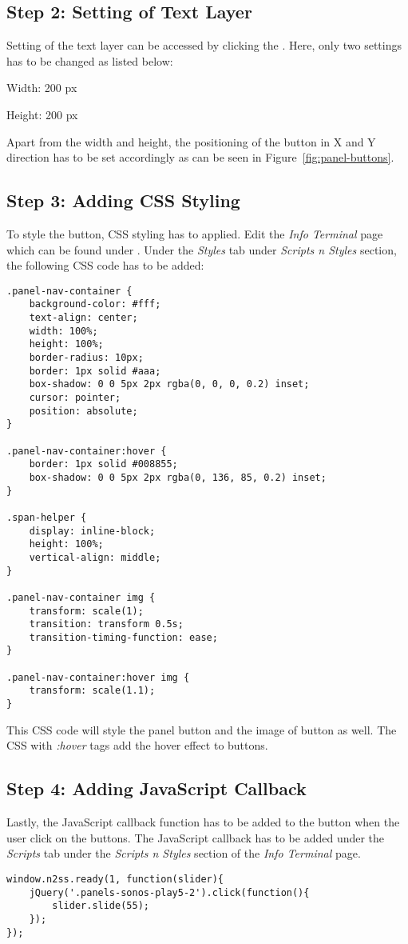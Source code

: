 \subsection*{Step 2: Setting of Text Layer}
Setting of the text layer can be accessed by clicking the . Here, only two settings has to be changed as listed below:
\begin{itemize*}
\item Width: 200 px
\item Height: 200 px
\end{itemize*}

Apart from the width and height, the positioning of the button in X and Y direction has to be set accordingly as can be seen in Figure~\ref{fig:panel-buttons}.

\subsection*{Step 3: Adding CSS Styling}
To style the button, CSS styling has to applied. Edit the \emph{Info Terminal} page which can be found under . Under the \emph{Styles} tab under \emph{Scripts n Styles} section, the following CSS code has to be added:
\begin{lstlisting}
.panel-nav-container {
	background-color: #fff;
	text-align: center;
	width: 100%;
	height: 100%;
	border-radius: 10px;
	border: 1px solid #aaa;
	box-shadow: 0 0 5px 2px rgba(0, 0, 0, 0.2) inset;
	cursor: pointer;
	position: absolute;
}

.panel-nav-container:hover {
	border: 1px solid #008855;
	box-shadow: 0 0 5px 2px rgba(0, 136, 85, 0.2) inset;
}

.span-helper {
	display: inline-block;
	height: 100%;
	vertical-align: middle;
}

.panel-nav-container img {
	transform: scale(1);
	transition: transform 0.5s;
	transition-timing-function: ease;
}

.panel-nav-container:hover img {
	transform: scale(1.1);
}
\end{lstlisting}

This CSS code will style the panel button and the image of button as well. The CSS with \emph{:hover} tags add the hover effect to buttons.

\subsection*{Step 4: Adding JavaScript Callback}
Lastly, the JavaScript callback function has to be added to the button when the user click on the buttons. The JavaScript callback has to be added under the \emph{Scripts} tab under the \emph{Scripts n Styles} section of the \emph{Info Terminal} page.
\begin{lstlisting}
window.n2ss.ready(1, function(slider){
	jQuery('.panels-sonos-play5-2').click(function(){
		slider.slide(55);
	});
});
\end{lstlisting}

